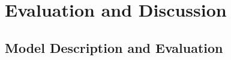 




\def\baselinestretch{1}

\chapter{Evaluation and Discussion}



\smallskip

\goodbreak

\section{Model Description and Evaluation}
